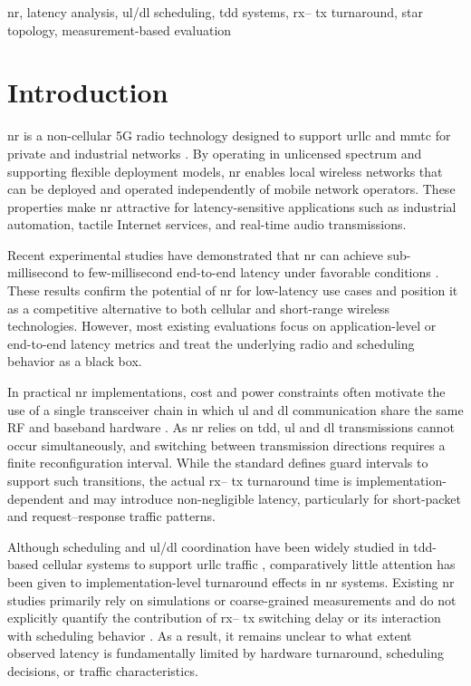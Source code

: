 \documentclass[conference]{IEEEtran}
\begin{document}
\begin{IEEEkeywords}
\gls{nr}, latency analysis, \gls{ul}/\gls{dl} scheduling, \gls{tdd} systems,  \gls{rx}-- \gls{tx} turnaround, star topology, measurement-based evaluation
\end{IEEEkeywords}

\section{Introduction}
\gls{nr} is a non-cellular 5G radio technology designed to support  \gls{urllc} and \gls{mmtc} for private and industrial networks \cite{etsi_dect_nr_overview,perez_guirao_dect_nr_essentials}. By operating in unlicensed spectrum and supporting flexible deployment models, \gls{nr} enables local wireless networks that can be deployed and operated independently of mobile network operators. These properties make \gls{nr} attractive for latency-sensitive applications such as industrial automation, tactile Internet services, and real-time audio transmissions\cite{dect_live_audio_latency}.

Recent experimental studies have demonstrated that \gls{nr} can achieve sub-millisecond to few-millisecond end-to-end latency under favorable conditions \cite{dect_live_audio_latency,cheap_5g_dect_nr,silfur_dect_nr_performance}. These results confirm the potential of \gls{nr} for low-latency use cases and position it as a competitive alternative to both cellular and short-range wireless technologies. However, most existing evaluations focus on application-level or end-to-end latency metrics and treat the underlying radio and scheduling behavior as a black box.

In practical \gls{nr} implementations, cost and power constraints often motivate the use of a single transceiver chain in which \gls{ul} and \gls{dl} communication share the same RF and baseband hardware \cite{etsi_dect_nr_architecture}. As \gls{nr} relies on \gls{tdd}, \gls{ul} and \gls{dl} transmissions cannot occur simultaneously, and switching between transmission directions requires a finite reconfiguration interval. While the standard defines guard intervals to support such transitions, the actual  \gls{rx}-- \gls{tx} turnaround time is implementation-dependent and may introduce non-negligible latency, particularly for short-packet and request--response traffic patterns.

Although scheduling and \gls{ul}/\gls{dl} coordination have been widely studied in \gls{tdd}-based cellular systems to support  \gls{urllc} traffic \cite{tdd_scheduling_urllc}, comparatively little attention has been given to implementation-level turnaround effects in \gls{nr} systems. Existing \gls{nr} studies primarily rely on simulations or coarse-grained measurements and do not explicitly quantify the contribution of  \gls{rx}-- \gls{tx} switching delay or its interaction with scheduling behavior \cite{dect_mesh_performance,near_urllc_multihop_dect}. As a result, it remains unclear to what extent observed latency is fundamentally limited by hardware turnaround, scheduling decisions, or traffic characteristics.
\end{document}
